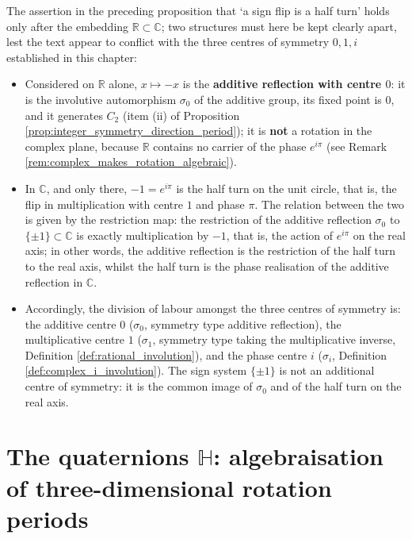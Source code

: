 \begin{remark}\label{rem:sign_versus_additive_reflection}
The assertion in the preceding proposition that `a sign flip is a half turn' holds only after the embedding $\mathbb{R}\subset\mathbb{C}$; two structures must here be kept clearly apart, lest the text appear to conflict with the three centres of symmetry $0,1,i$ established in this chapter:
\begin{itemize}
    \item Considered on $\mathbb{R}$ alone, $x\mapsto-x$ is the \textbf{additive reflection with centre $0$}: it is the involutive automorphism $\sigma_0$ of the additive group, its fixed point is $0$, and it generates $C_2$ (item (ii) of Proposition \ref{prop:integer_symmetry_direction_period}); it is \textbf{not} a rotation in the complex plane, because $\mathbb{R}$ contains no carrier of the phase $e^{i\pi}$ (see Remark \ref{rem:complex_makes_rotation_algebraic}).
    \item In $\mathbb{C}$, and only there, $-1=e^{i\pi}$ is the half turn on the unit circle, that is, the flip in multiplication with centre $1$ and phase $\pi$. The relation between the two is given by the restriction map: the restriction of the additive reflection $\sigma_0$ to $\{\pm1\}\subset\mathbb{C}$ is exactly multiplication by $-1$, that is, the action of $e^{i\pi}$ on the real axis; in other words, the additive reflection is the restriction of the half turn to the real axis, whilst the half turn is the phase realisation of the additive reflection in $\mathbb{C}$.
    \item Accordingly, the division of labour amongst the three centres of symmetry is: the additive centre $0$ ($\sigma_0$, symmetry type additive reflection), the multiplicative centre $1$ ($\sigma_1$, symmetry type taking the multiplicative inverse, Definition \ref{def:rational_involution}), and the phase centre $i$ ($\sigma_i$, Definition \ref{def:complex_i_involution}). The sign system $\{\pm1\}$ is not an additional centre of symmetry: it is the common image of $\sigma_0$ and of the half turn on the real axis.
\end{itemize}
\end{remark}

\section{\texorpdfstring{The quaternions $\mathbb{H}$: algebraisation of three-dimensional rotation periods}{The quaternions H: algebraisation of three-dimensional rotation periods}}

